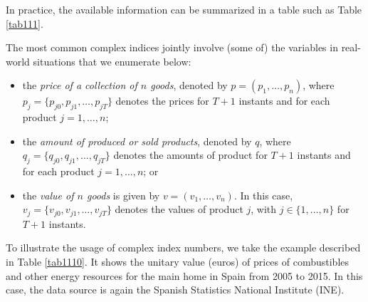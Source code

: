 In practice, the available information can be summarized in a table such as Table \ref{tab111}. 

	\begin{table}[h!]\centering{}\caption{Evolution of a set of magnitudes $X$ from time $0$ to $T$.}\label{tab111}\end{table}

The most common complex indices jointly involve (some of) the variables in real-world situations that we enumerate below:
\begin{itemize}
	\item  the \emph{price of a collection of $n$ goods}, denoted by $p=(p_1,\dots,p_n)$, where $p_j=\{p_{j0},p_{j1},\dots,p_{jT}\}$ denotes the prices for $T+1$ instants and for each product $j=1,\dots,n$;
	\item  the \emph{amount  of produced or sold products}, denoted by $q$, where $q_j=\{q_{j0},q_{j1},\dots,q_{jT}\}$ denotes the amounts of product for $T+1$ instants and for each product $j=1,\dots,n$; or
	\item the \emph{value of $n$ goods} is given by $v=(v_1,\dots,v_n)$. In this case,  $v_j=\{v_{j0},v_{j1},\dots,v_{jT}\}$ denotes the values of product $j$, with $j\in \{1,\dots,n\}$ for $T+1$ instants.
\end{itemize}

To illustrate the usage of complex index numbers, we take the example described in Table \ref{tab1110}. It shows the unitary value (euros) of prices of combustibles and other energy resources for the main home in Spain from 2005 to 2015. In this case, the data source is again the Spanish Statistics National Institute (INE).

